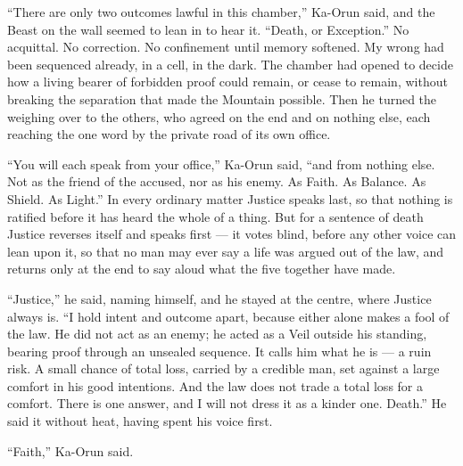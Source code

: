 ``There are only two outcomes lawful in this chamber,'' Ka-Orun said, and the Beast on the wall seemed to lean in to hear it. ``Death, or Exception.'' No acquittal. No correction. No confinement until memory softened. My wrong had been sequenced already, in a cell, in the dark. The chamber had opened to decide how a living bearer of forbidden proof could remain, or cease to remain, without breaking the separation that made the Mountain possible. Then he turned the weighing over to the others, who agreed on the end and on nothing else, each reaching the one word by the private road of its own office.\par

``You will each speak from your office,'' Ka-Orun said, ``and from nothing else. Not as the friend of the accused, nor as his enemy. As Faith. As Balance. As Shield. As Light.'' In every ordinary matter Justice speaks last, so that nothing is ratified before it has heard the whole of a thing. But for a sentence of death Justice reverses itself and speaks first --- it votes blind, before any other voice can lean upon it, so that no man may ever say a life was argued out of the law, and returns only at the end to say aloud what the five together have made.\par

``Justice,'' he said, naming himself, and he stayed at the centre, where Justice always is. ``I hold intent and outcome apart, because either alone makes a fool of the law. He did not act as an enemy; he acted as a Veil outside his standing, bearing proof through an unsealed sequence. It calls him what he is --- a ruin risk. A small chance of total loss, carried by a credible man, set against a large comfort in his good intentions. And the law does not trade a total loss for a comfort. There is one answer, and I will not dress it as a kinder one. Death.'' He said it without heat, having spent his voice first.\par

``Faith,'' Ka-Orun said.\par

